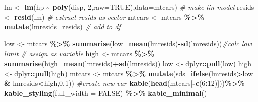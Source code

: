 \documentclass[
]{article}
\newenvironment{Shaded}{\begin{snugshade}}{\end{snugshade}}
\newcommand{\AttributeTok}[1]{\textcolor[rgb]{0.13,0.29,0.53}{#1}}
\newcommand{\CommentTok}[1]{\textcolor[rgb]{0.56,0.35,0.01}{\textit{#1}}}
\newcommand{\ConstantTok}[1]{\textcolor[rgb]{0.56,0.35,0.01}{#1}}
\newcommand{\DecValTok}[1]{\textcolor[rgb]{0.00,0.00,0.81}{#1}}
\newcommand{\FunctionTok}[1]{\textcolor[rgb]{0.13,0.29,0.53}{\textbf{#1}}}
\newcommand{\NormalTok}[1]{#1}
\newcommand{\OtherTok}[1]{\textcolor[rgb]{0.56,0.35,0.01}{#1}}
\newcommand{\SpecialCharTok}[1]{\textcolor[rgb]{0.81,0.36,0.00}{\textbf{#1}}}
\begin{document}
\begin{Shaded}
\begin{Highlighting}[]
\NormalTok{lm }\OtherTok{\textless{}{-}} \FunctionTok{lm}\NormalTok{(hp }\SpecialCharTok{\textasciitilde{}} \FunctionTok{poly}\NormalTok{(disp, }\DecValTok{2}\NormalTok{,}\AttributeTok{raw=}\ConstantTok{TRUE}\NormalTok{),}\AttributeTok{data=}\NormalTok{mtcars) }\CommentTok{\# make lin model}
\NormalTok{resids }\OtherTok{\textless{}{-}} \FunctionTok{resid}\NormalTok{(lm) }\CommentTok{\# extract resids as vector}
\NormalTok{mtcars }\OtherTok{\textless{}{-}}\NormalTok{ mtcars }\SpecialCharTok{\%\textgreater{}\%} \FunctionTok{mutate}\NormalTok{(}\AttributeTok{lmresids=}\NormalTok{resids) }\CommentTok{\# add to df}


\NormalTok{low }\OtherTok{\textless{}{-}}\NormalTok{ mtcars }\SpecialCharTok{\%\textgreater{}\%} \FunctionTok{summarise}\NormalTok{(}\AttributeTok{low=}\FunctionTok{mean}\NormalTok{(lmresids)}\SpecialCharTok{{-}}\FunctionTok{sd}\NormalTok{(lmresids))}\CommentTok{\#calc low limit}
 \CommentTok{\# assign as variable}
\NormalTok{high }\OtherTok{\textless{}{-}}\NormalTok{ mtcars }\SpecialCharTok{\%\textgreater{}\%} \FunctionTok{summarise}\NormalTok{(}\AttributeTok{high=}\FunctionTok{mean}\NormalTok{(lmresids)}\SpecialCharTok{+}\FunctionTok{sd}\NormalTok{(lmresids))}
\NormalTok{low }\OtherTok{\textless{}{-}}\NormalTok{ dplyr}\SpecialCharTok{::}\FunctionTok{pull}\NormalTok{(low)}
\NormalTok{high }\OtherTok{\textless{}{-}}\NormalTok{ dplyr}\SpecialCharTok{::}\FunctionTok{pull}\NormalTok{(high)                   }
\NormalTok{mtcars }\OtherTok{\textless{}{-}}\NormalTok{ mtcars }\SpecialCharTok{\%\textgreater{}\%} \FunctionTok{mutate}\NormalTok{(}\AttributeTok{sds=}\FunctionTok{ifelse}\NormalTok{(lmresids}\SpecialCharTok{\textgreater{}}\NormalTok{low }\SpecialCharTok{\&}\NormalTok{ lmresids}\SpecialCharTok{\textless{}}\NormalTok{high,}\DecValTok{0}\NormalTok{,}\DecValTok{1}\NormalTok{)) }\CommentTok{\#create new var}
\FunctionTok{kable}\NormalTok{(}\FunctionTok{head}\NormalTok{(mtcars[}\SpecialCharTok{{-}}\FunctionTok{c}\NormalTok{(}\DecValTok{6}\SpecialCharTok{:}\DecValTok{12}\NormalTok{)]))}\SpecialCharTok{\%\textgreater{}\%} 
  \FunctionTok{kable\_styling}\NormalTok{(}\AttributeTok{full\_width =} \ConstantTok{FALSE}\NormalTok{) }\SpecialCharTok{\%\textgreater{}\%} \FunctionTok{kable\_minimal}\NormalTok{()}
\end{Highlighting}
\end{Shaded}
\end{document}
